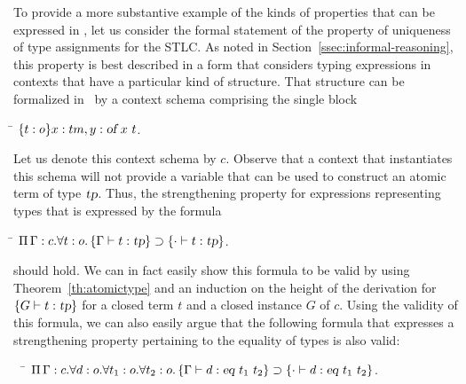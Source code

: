 To provide a more substantive example of the kinds of properties that
can be expressed in \logic, let us consider the formal statement of
the property of uniqueness of type assignments for the STLC.
%
As noted in Section~\ref{ssec:informal-reasoning}, this property is
best described in a form that considers typing expressions in
contexts that have a particular kind of structure. 
%
That structure can be formalized in \logic\ by a context
schema comprising the single block
\begin{tabbing}
  \qquad\=\kill
  \> $\{t : o\}x:tm,y:\mbox{\sl of}\  x\  t$.
\end{tabbing}
%
Let us denote this context schema by $c$.
%
Observe that a context that instantiates this schema will not
provide a variable that can be used to construct an atomic term of
type $\mbox{\sl tp}$.
%
Thus, the strengthening property for expressions representing types
that is expressed by the formula 
\begin{tabbing}
  \qquad\=\kill
  \> $\Pi\,\Gamma : c.\forall t :o. \left\{\Gamma \vdash t : \mbox{\sl tp}\right\}\supset \left\{\cdot \vdash t:\mbox{\sl tp}\right\}$.
\end{tabbing}
should hold.
%
We can in fact easily show this formula to be valid by
using Theorem~\ref{th:atomictype} and an induction on the height of
the derivation for $\left\{G \vdash t : \mbox{\sl tp}\right\}$ for a closed term $t$ and a
closed instance $G$ of $c$.
%
Using the validity of this formula, we can also easily argue that the
following formula that expresses a strengthening property pertaining to
the equality of types is also valid:
\begin{tabbing}
  \ \ \=\kill
  \> $\Pi\,\Gamma : c.\forall d :o. \forall t_1 :o. \forall t_2 : o. \left\{\Gamma \vdash d : \mbox{\sl eq}\  t_1\  t_2\right\}\supset \left\{\cdot \vdash d:\mbox{\sl eq}\  t_1\  t_2\right\}$.
\end{tabbing}

